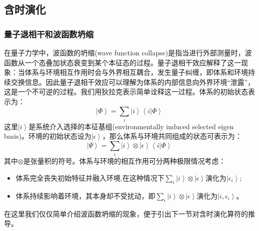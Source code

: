 \subsection{含时演化}
\subsubsection{量子退相干和波函数坍缩}
在量子力学中，波函数的坍缩(wave function collapse)是指当进行外部测量时，波函数从一个态叠加状态衰变到某个本征态的过程。量子退相干效应解释了这一现象：当体系与环境相互作用时会与外界相互耦合，发生量子纠缠，即体系和环境持续交换信息。因此量子退相干效应可以理解为体系的内部信息向外界环境“泄露”，这是一个不可逆的过程。我们用狄拉克表示简单诠释这一过程。体系的初始状态表示为：
\begin{equation}
  \left| \Phi \right> = \sum_i \left| i \right> \left< i | \Phi \right>
\end{equation}
这里$\left| i \right>$是系统介入选择的本征基组(environmentally induced selected eigen basis)。环境的初始状态设为$\left| \epsilon \right>$，那么体系与环境共同组成的状态可表示为：
\begin{equation}
  \left| \Psi \right> = \sum_i \left| i \right> \otimes \left| \epsilon \right> \left< i|\Phi \right>
\end{equation}
其中$\otimes$是张量积的符号。体系与环境的相互作用可分两种极限情况考虑：
\begin{itemize}
  \item 体系完全丧失初始特征并融入环境,在这种情况下$\sum_i \left| i \right> \otimes \left| \epsilon \right>$演化为$\left| \epsilon_i \right>$;
  \item 体系持续影响着环境，其本身却不受扰动，即$\sum_i \left| i \right> \otimes \left| \epsilon \right>$演化为$\left| i,\epsilon_i \right>$。
\end{itemize}\par 
在这里我们仅仅简单介绍波函数坍缩的现象，便于引出下一节对含时演化算符的推导。


